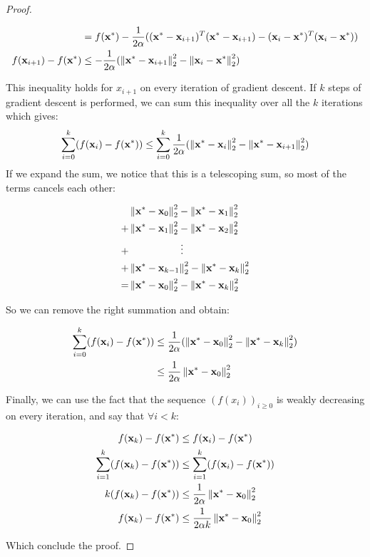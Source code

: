 \begin{proof}
\begin{ceqn}
\begin{align*}
            &= f(\vx^*) - \frac{1}{2\alpha} ((\vx^* - \vx_{i+1})^T(\vx^* - \vx_{i+1}) - (\vx_i - \vx^*)^T(\vx_i - \vx^*)) \\
            f(\vx_{i+1}) - f(\vx^*) &\leq - \frac{1}{2\alpha} (\norm{\vx^* - \vx_{i+1}}^2_2 - \norm{\vx_i - \vx^*}^2_2)
        \end{align*}
    \end{ceqn}
    This inequality holds for $x_{i+1}$ on every iteration of gradient descent. If $k$ steps of gradient descent is performed, we can sum this inequality over all the $k$ iterations which gives:
    $$\sum_{i=0}^{k}(f(\vx_i) - f(\vx^*)) \leq \sum_{i=0}^{k} \frac{1}{2\alpha} (\norm{\vx^* - \vx_i}^2_2 - \norm{\vx^* - \vx_{i+1}}^2_2)$$
    If we expand the sum, we notice that this is a telescoping sum, so most of the terms cancels each other:
    \begin{ceqn}
        \begin{align*}
            & \norm{\vx^* - \vx_0}^2_2 - \norm{\vx^* - \vx_1}^2_2 \\
            +& \norm{\vx^* - \vx_1}^2_2 - \norm{\vx^* - \vx_2}^2_2 \\
            +& \hspace{0.72in} \vdots \\
            +& \norm{\vx^* - \vx_{k-1}}^2_2 - \norm{\vx^* - \vx_k}^2_2 \\
            =& \norm{\vx^* - \vx_0}^2_2 - \norm{\vx^* - \vx_k}^2_2
        \end{align*}
    \end{ceqn}
    So we can remove the right summation and obtain:
    \begin{ceqn}
        \begin{align*}
            \sum_{i=0}^{k}(f(\vx_i) - f(\vx^*)) &\leq \frac{1}{2\alpha} (\norm{\vx^* - \vx_0}^2_2 - \norm{\vx^* - \vx_k}^2_2) \\
            &\leq \frac{1}{2\alpha} \norm{\vx^* - \vx_0}^2_2
        \end{align*}
    \end{ceqn}
    Finally, we can use the fact that the sequence $(f(x_i))_{i \geq 0}$ is weakly decreasing on every iteration, and say that $\forall i < k$:
    \begin{ceqn}
        \begin{align*}
            f(\vx_k) - f(\vx^*) &\leq f(\vx_i) - f(\vx^*) \\
            \sum_{i=1}^{k}(f(\vx_k) - f(\vx^*)) &\leq \sum_{i=1}^{k}(f(\vx_i) - f(\vx^*)) \\
            k(f(\vx_k) - f(\vx^*)) &\leq \frac{1}{2\alpha} \norm{\vx^* - \vx_0}^2_2 \\
            f(\vx_k) - f(\vx^*) &\leq \frac{1}{2\alpha k} \norm{\vx^* - \vx_0}^2_2
        \end{align*}
    \end{ceqn}
    Which conclude the proof.
\end{proof}

